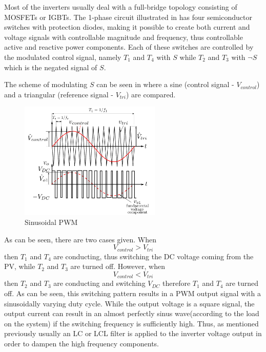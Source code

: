 Most of the inverters usually deal with a full-bridge topology consisting of MOSFETs or IGBTs. The 1-phase circuit illustrated in  has four semiconductor switches with protection diodes, making it possible to create both current and voltage signals with controllable magnitude and frequency, thus controllable active and reactive power components. Each of these switches are controlled by the modulated control signal, namely $T_1$ and $T_4$ with $S$ while $T_2$ and $T_3$ with  $\neg{S}$ which is the negated signal of $S$.

The scheme of modulating $S$ can be seen in  where a sine (control signal - $V_{control}$) and a triangular (reference signal - $V_{tri}$) are compared.   

\begin{figure}[H]
\centering
\includegraphics[width=0.6\textwidth]{rapport/analyse/sinPWM}
\caption{Sinusoidal PWM \cite{bud_inverter_PV}}
\label{fig:sinPWM}
\end{figure}

As can be seen, there are two cases given. When 
\begin{equation} 
\label{eq:case1}
V_{control} > V_{tri} %
\end{equation}
then $T_1$ and $T_4$ are conducting, thus switching the DC voltage coming from the PV, while $T_2$ and $T_3$ are turned off. However, when 
\begin{equation} 
\label{eq:case1}
V_{control} < V_{tri}
\end{equation}
then $T_2$ and $T_3$ are conducting and switching $V_{DC}$ therefore $T_1$ and $T_4$ are turned off. As can be seen, this switching pattern results in a PWM output signal with a sinusoidally varying duty cycle. While the output voltage is a square signal, the output current can result in an almost perfectly sinus wave(according to the load on the system) if the switching frequency is sufficiently high. Thus, as mentioned previously usually an LC or LCL filter is applied to the inverter voltage output in order to dampen the high frequency components. 

